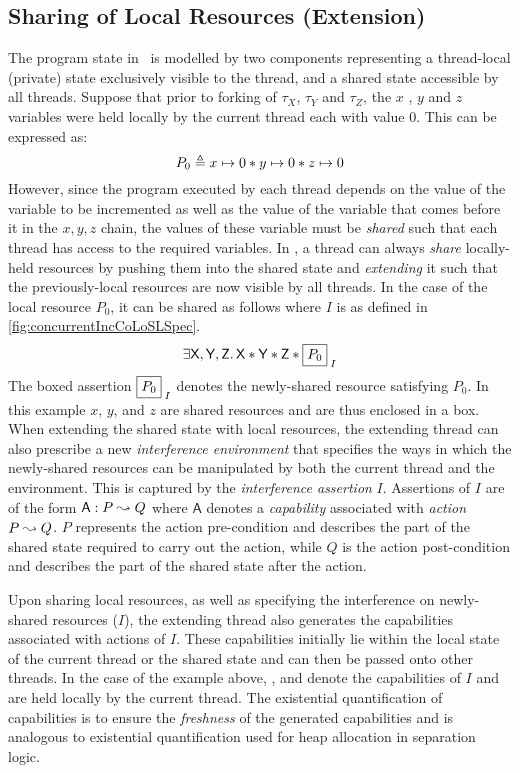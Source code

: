 \subsection{Sharing of Local Resources (Extension)}\label{subsec:extend}
The program state in \colosl\ is modelled by two components representing a thread-local (private) state exclusively visible to the thread, and a shared state accessible by all threads. Suppose that prior to forking of $\tau_X$, $\tau_Y$ and $\tau_Z$, the $x$ , $y$ and $z$ variables were held locally by the current thread each with value $0$. This can be expressed as:
%
\[
	P_{0} \mathrel{\triangleq} x \mapsto 0 * y \mapsto 0 * z \mapsto 0
\]
%
However, since the program executed by each thread depends on the value of the variable to be incremented as well as the value of the variable that comes before it in the $x, y, z$ chain, the values of these variable must be \emph{shared} such that each thread has access to the required variables. In \colosl, a thread can always \emph{share} locally-held resources by pushing them into the shared state and \emph{extending} it such that the previously-local resources are now visible by all threads. In the case of the local resource $P_0$, it can be shared as follows where $I$ is as defined in \fig\ref{fig:concurrentIncCoLoSLSpec}.
%
\[
	\exsts{\token{X}, \token{Y}, \token{Z}} \token{X} * \token{Y} * \token{Z} * \shared{P_0}{I}
\]
%
The boxed assertion $\shared{P_0}{I}$ denotes the newly-shared resource satisfying $P_0$. In this example $x$, $y$, and $z$ are shared resources and are thus enclosed in a box. 
When extending the shared state with local resources, the extending thread can also prescribe a new \emph{interference environment} that specifies the ways in which the newly-shared resources can be manipulated by both the current thread and the environment. This is captured by the \emph{interference assertion} $I$.
Assertions of $I$ are of the form $\textsf{A}: P \mathrel{\leadsto} Q$ where $\textsf{A}$ denotes a \emph{capability} associated with \emph{action} $P \mathrel{\leadsto} Q$. $P$ represents the action pre-condition and describes the part of the shared state required to carry out the action, while $Q$ is the action post-condition and describes the part of the shared state after the action. 

Upon sharing local resources, as well as specifying the interference on newly-shared resources ($I$), the extending thread also generates the capabilities associated with actions of $I$. These capabilities initially lie within the local state of the current thread or the shared state and can then be passed onto other threads. In the case of the example above, ,  and  denote the capabilities of $I$ and are held locally by the current thread. The existential quantification of capabilities is to ensure the \emph{freshness} of the generated capabilities and is analogous to existential quantification used for heap allocation in separation logic. 

